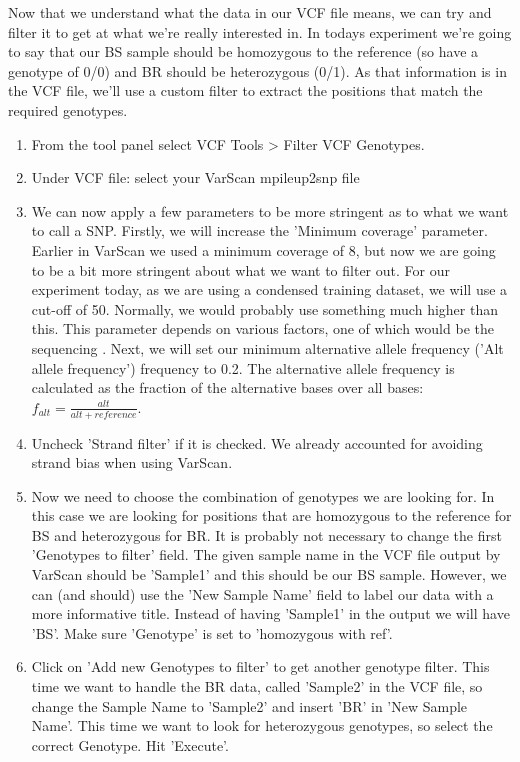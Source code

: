 \documentclass[12pt,a4paper]{article}
\begin{document}
Now that we understand what the data in our VCF file means, we can try
and filter it to get at what we're really interested in. In todays
experiment we're going to say that our BS sample should be homozygous
to the reference (so have a genotype of 0/0) and BR should be
heterozygous (0/1). As that information is in the VCF file, we'll use
a custom filter to extract the positions that match the required
genotypes.
\begin{enumerate}
	\item From the tool panel select VCF Tools > Filter VCF
          Genotypes.
	\item Under VCF file: select your VarScan mpileup2snp file   
	\item We can now apply a few parameters to be more stringent
          as to what we want to call a SNP. Firstly, we will increase
          the 'Minimum coverage' parameter. Earlier in VarScan we used
          a minimum coverage of 8, but now we are going to be a bit
          more stringent about what we want to filter out.  For our
          experiment today, as we are using a condensed training
          dataset, we will use a cut-off of 50. Normally, we would
          probably use something much higher than this. This parameter
          depends on various factors, one of which would be the
          sequencing . Next, we will set our minimum alternative
          allele frequency ('Alt allele frequency') frequency to
          0.2. The alternative allele frequency is calculated as the
          fraction of the alternative bases over all bases:
          $f_{alt} = \frac{alt}{alt+reference}$. \\
        \item Uncheck 'Strand filter' if it is checked. We already
          accounted for avoiding strand bias when using VarScan.
	\item Now we need to choose the combination of genotypes we
          are looking for. In this case we are looking for positions
          that are homozygous to the reference for BS and heterozygous
          for BR. It is probably not necessary to change the first
          'Genotypes to filter' field. The given sample name in the
          VCF file output by VarScan should be 'Sample1' and this
          should be our BS sample. However, we can (and should) use
          the 'New Sample Name' field to label our data with a more
          informative title. Instead of having 'Sample1' in the output
          we will have 'BS'. Make sure 'Genotype' is set to
          'homozygous with ref'.
	\item Click on 'Add new Genotypes to filter' to get another
          genotype filter. This time we want to handle the BR data,
          called 'Sample2' in the VCF file, so change the Sample Name
          to 'Sample2' and insert 'BR' in 'New Sample Name'. This time
          we want to look for heterozygous genotypes, so select the
          correct Genotype. Hit 'Execute'.
\end{enumerate}
\end{document}
